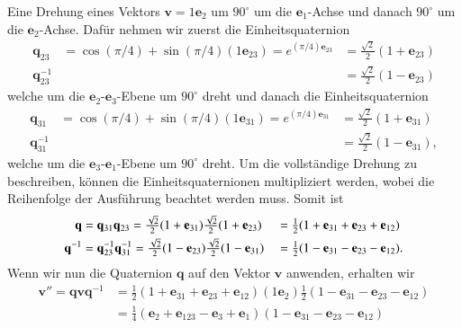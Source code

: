 \begin{beispiel}
	Eine Drehung eines Vektors $\mathbf{v}= 1\mathbf{e}_2$ um $90^\circ$ um die $\mathbf{e}_1$-Achse und danach $90^\circ$ um die $\mathbf{e}_2$-Achse.
Dafür nehmen wir zuerst die Einheitsquaternion 
	\begin{align*}
	\mathbf{q}_{23} &= \cos(\pi/4) + \sin(\pi/4)(1\mathbf{e}_{23}) =  e^{(\pi/4)\mathbf{e}_{23}} &= \textstyle{\frac{\sqrt{2}}{2}}(1 + \mathbf{e}_{23})\\
	\mathbf{q}_{23}^{-1} &&= \textstyle{\frac{\sqrt{2}}{2}} (1- \mathbf{e}_{23})
	\end{align*}
	welche um die $\mathbf{e}_{2}$-$\mathbf{e}_{3}$-Ebene um $90^\circ$ dreht und danach die Einheitsquaternion 
	\begin{align*}
	\mathbf{q}_{31} &= \cos(\pi/4) + \sin(\pi/4)(1\mathbf{e}_{31}) =  e^{(\pi/4)\mathbf{e}_{31}} &= \textstyle{\frac{\sqrt{2}}{2}}(1 + \mathbf{e}_{31})\\
	\mathbf{q}_{31}^{-1} &&= \textstyle{\frac{\sqrt{2}}{2}}(1 - \mathbf{e}_{31}),
	\end{align*}
	welche um die $\mathbf{e}_{3}$-$\mathbf{e}_{1}$-Ebene  um $90^\circ$ dreht.
Um die vollständige Drehung zu beschreiben, können die Einheitsquaternionen multipliziert werden, wobei die Reihenfolge der Ausführung beachtet werden muss.
Somit ist
\begin{align}
\label{FormelBeispielQuaternion}
\mathbf{q}
&=
\mathbf{q}_{31}\mathbf{q}_{23}
=
\textstyle{\frac{\sqrt{2}}{2}}(1 + \mathbf{e}_{31})\textstyle{\frac{\sqrt{2}}{2}}(1 + \mathbf{e}_{23})
&
&=
\textstyle{\frac{1}{2}}(1 + \mathbf{e}_{31} + \mathbf{e}_{23} + \mathbf{e}_{12})
\\
\mathbf{q}^{-1}
&=
\mathbf{q}_{23}^{-1}\mathbf{q}_{31}^{-1}
=
\textstyle{\frac{\sqrt{2}}{2}} (1- \mathbf{e}_{23})\textstyle{\frac{\sqrt{2}}{2}}(1 -\mathbf{e}_{31})
&
&=
\textstyle{\frac{1}{2}}(1 - \mathbf{e}_{31} - \mathbf{e}_{23} - \mathbf{e}_{12}).
\notag
\end{align}
	Wenn wir nun die Quaternion $\mathbf{q}$ auf den Vektor $\mathbf{v}$ anwenden, erhalten wir
	\begin{align*}
	\mathbf{v}'' = \mathbf{qvq}^{-1} &= \textstyle{\frac{1}{2}}(1 + \mathbf{e}_{31} +  \mathbf{e}_{23} +  \mathbf{e}_{12})(1\mathbf{e}_2)\textstyle{\frac{1}{2}}(1 - \mathbf{e}_{31} -  \mathbf{e}_{23} -  \mathbf{e}_{12})\\ 
	&= \textstyle{\frac{1}{4}}(\mathbf{e}_2 +  \mathbf{e}_{123} -  \mathbf{e}_3 +  \mathbf{e}_1)(1 - \mathbf{e}_{31} -  \mathbf{e}_{23} -  \mathbf{e}_{12})\\

\end{align*}
\end{beispiel}
